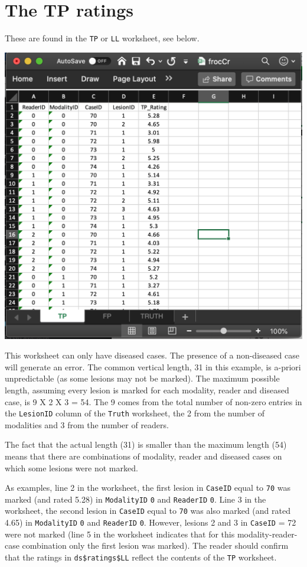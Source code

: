 \documentclass[
]{book}
\begin{document}
\hypertarget{quick-start-froc-data-tp}{%
\section{The TP ratings}\label{quick-start-froc-data-tp}}

These are found in the \texttt{TP} or \texttt{LL} worksheet, see below.

\includegraphics[width=1\textwidth,height=\textheight]{images/quick-start/frocCrLL.png}

This worksheet can only have diseased cases. The presence of a non-diseased case will generate an error. The common vertical length, 31 in this example, is a-priori unpredictable (as some lesions may not be marked). The maximum possible length, assuming every lesion is marked for each modality, reader and diseased case, is 9 X 2 X 3 = 54. The 9 comes from the total number of non-zero entries in the \texttt{LesionID} column of the \texttt{Truth} worksheet, the 2 from the number of modalities and 3 from the number of readers.

The fact that the actual length (31) is smaller than the maximum length (54) means that there are combinations of modality, reader and diseased cases on which some lesions were not marked.

As examples, line 2 in the worksheet, the first lesion in \texttt{CaseID} equal to \texttt{70} was marked (and rated 5.28) in \texttt{ModalityID} \texttt{0} and \texttt{ReaderID} \texttt{0}. Line 3 in the worksheet, the second lesion in \texttt{CaseID} equal to \texttt{70} was also marked (and rated 4.65) in \texttt{ModalityID} \texttt{0} and \texttt{ReaderID} \texttt{0}. However, lesions 2 and 3 in \texttt{CaseID} = 72 were not marked (line 5 in the worksheet indicates that for this modality-reader-case combination only the first lesion was marked). The reader should confirm that the ratings in \texttt{ds\$ratings\$LL} reflect the contents of the \texttt{TP} worksheet.
\end{document}
